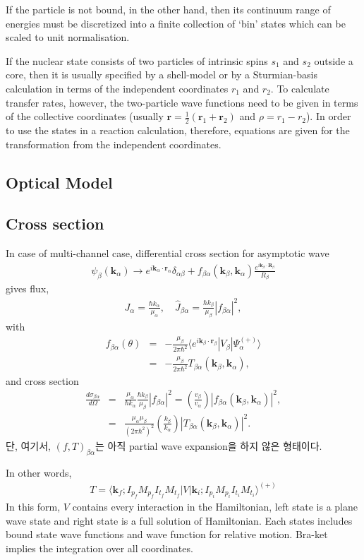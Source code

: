 \documentclass[11pt]{book}
\def\bm{\boldsymbol}
\def\vk{{\bm k}}
\def\vr{{\bm r}}
\def\vR{{\bm R}}
\def\la{\langle}
\def\ra{\rangle}
\newcommand{\bea}{\begin{eqnarray}}
\newcommand{\eea}{\end{eqnarray}}
\newcommand{\no}{\nonumber \\}
\begin{document}
If the particle is not bound, in the other hand, then its continuum range of
energies must be discretized into a finite collection of {\color{blue} ‘bin’ states} which can be scaled to unit
normalisation. 

If the nuclear state consists of two particles of intrinsic spins 
$s_1$ and $s_2$ outside
a core, then it is usually specified by a shell-model 
or by a Sturmian-basis calculation in terms
of the independent coordinates $r_1$ and $r_2$. 
To calculate transfer rates, however, 
the {\color{blue} two-particle
wave functions} need to be given in terms of the collective coordinates 
(usually $\vr = \frac{1}{2}(\vr_1+\vr_2)$
and  $\rho= r_1 - r_2$). 
In order to use the states in a reaction calculation, therefore, equations are
given for the transformation from the independent coordinates.

\subsection{Optical Model}


\subsection{Cross section}
In case of multi-channel case, differential cross section for asymptotic wave
\bea 
\psi_{\beta}(\vk_\alpha)
 \to e^{i \vk_\alpha\cdot \vr_\alpha}\delta_{\alpha\beta}
        +f_{\beta\alpha}(\vk_\beta,\vk_\alpha)\frac{e^{i\vk_\beta\cdot \vR_\beta}}{R_\beta}
\eea 
gives flux,
\bea 
J_\alpha=\frac{\hbar k_\alpha}{\mu_\alpha},\quad 
\hat{J}_{\beta\alpha}=\frac{\hbar k_\beta}{\mu_\beta} |f_{\beta\alpha}|^2,
\eea 
with
\bea 
f_{\beta\alpha}(\theta)&=& -\frac{\mu_\beta}{2\pi\hbar^2}
                          \la e^{i\vk_\beta\cdot\vr_\beta}|V_\beta|\Psi^{(+)}_\alpha\ra
                          \no 
                        &=&-\frac{\mu_\beta}{2\pi\hbar^2} T_{\beta\alpha}(\vk_\beta,\vk_\alpha),   
\eea 
and cross section
\bea 
\frac{d\sigma_{\beta\alpha}}{d\Omega}&=&\frac{\mu_\alpha}{\hbar k_\alpha}
   \frac{\hbar k_\beta}{\mu_\beta}|f_{\beta\alpha}|^2 
   =(\frac{v_\beta}{v_\alpha})|f_{\beta\alpha}(\vk_\beta,\vk_\alpha)|^2 ,\no 
  &=&\frac{\mu_\alpha \mu_\beta}{(2\pi\hbar^2)^2}(\frac{k_\beta}{k_\alpha})
     | T_{\beta\alpha}(\vk_\beta,\vk_\alpha)|^2.
\eea 
단, 여기서, $(f,T)_{\beta \alpha}$는 아직 partial wave
expansion을 하지 않은 형태이다.

In other words,
\bea 
T=\la \vk_f; I_{p_f} M_{p_f} I_{t_f} M_{t_f}|V|\vk_i;I_{p_i} M_{p_i} I_{t_i} M_{t_i}\ra^{(+)} 
\eea 
In this form, $V$ contains every interaction in the Hamiltonian,
left state is a plane wave state and right state is a full solution of Hamiltonian. 
Each states includes bound state wave functions and wave function for relative motion.
Bra-ket implies the integration over all coordinates. 
\end{document}

